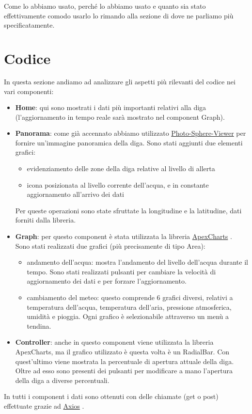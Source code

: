 \documentclass{article}
\newcommand{\apexcharts}{\href{https://apexcharts.com/}{ApexCharts} }
\newcommand{\axios}{\href{https://axios-http.com/}{Axios} }
\newcommand{\photosphereviewer}{\href{https://photo-sphere-viewer.js.org/}{Photo-Sphere-Viewer} }
\begin{document}
Come lo abbiamo usato, perché lo abbiamo usato e quanto sia stato effettivamente comodo usarlo lo rimando alla sezione di  dove ne parliamo più specificatamente.

\section{Codice}\label{sec:code}
In questa sezione andiamo ad analizzare gli aspetti più rilevanti del codice nei vari componenti:
\begin{itemize}
    \item \textbf{Home}: qui sono mostrati i dati più importanti relativi alla diga (l'aggiornamento in tempo reale sarà mostrato nel component Graph).
	\item \textbf{Panorama}: come già accennato abbiamo utilizzato \photosphereviewer per fornire un'immagine panoramica della diga. Sono stati aggiunti due elementi grafici:
    	\begin{itemize}
    	    \item evidenziamento delle zone della diga relative al livello di allerta
    	    \item icona posizionata al livello corrente dell'acqua, e in constante aggiornamento all'arrivo dei dati
    	\end{itemize}
	Per queste operazioni sono state sfruttate la longitudine e la latitudine, dati forniti dalla libreria.
	\item \textbf{Graph}: per questo component è stata utilizzata la libreria \apexcharts. Sono stati realizzati due grafici (più precisamente di tipo Area):
	\begin{itemize}
	    \item andamento dell'acqua: mostra l'andamento del livello dell'acqua durante il tempo. Sono stati realizzati pulsanti per cambiare la velocità di aggiornamento dei dati e per forzare l'aggiornamento.
	    \item cambiamento del meteo:  questo comprende 6 grafici diversi, relativi a temperatura dell'acqua, temperatura dell'aria, pressione atmosferica, umidità e pioggia. Ogni grafico è selezionabile attraverso un menù a tendina.
	\end{itemize}
	\item \textbf{Controller}: anche in questo component viene utilizzata la libreria ApexCharts, ma il grafico utilizzato è questa volta è un RadialBar. Con quest'ultimo viene mostrata la percentuale di apertura attuale della diga. Oltre ad esso sono presenti dei pulsanti per modificare a mano l'apertura della diga a diverse percentuali.
\end{itemize}
In tutti i component i dati sono ottenuti con delle chiamate (get o post) effettuate grazie ad \axios.
\end{document}
